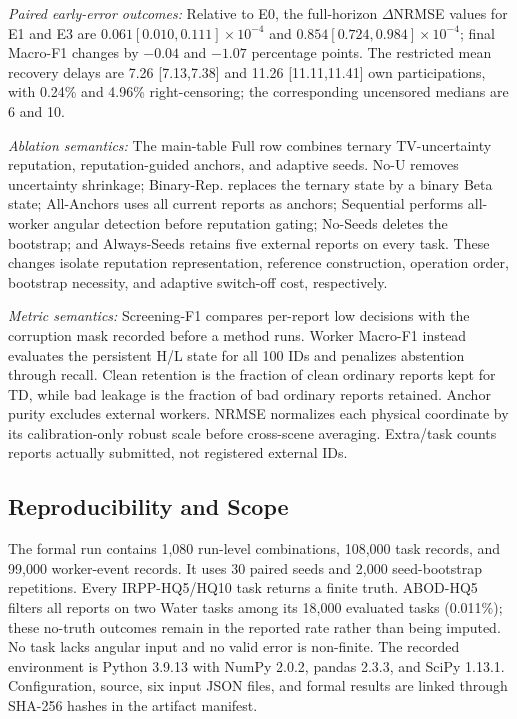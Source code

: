 \documentclass[journal]{IEEEtran}
\begin{document}
\textit{Paired early-error outcomes:}
Relative to E0, the full-horizon $\Delta$NRMSE values for E1 and E3 are
$0.061[0.010,0.111]\times10^{-4}$ and
$0.854[0.724,0.984]\times10^{-4}$; final Macro-F1 changes by $-0.04$ and
$-1.07$ percentage points. The restricted mean recovery delays are
7.26 [7.13,7.38] and 11.26 [11.11,11.41] own participations, with 0.24\% and
4.96\% right-censoring; the corresponding uncensored medians are 6 and 10.

\textit{Ablation semantics:}
The main-table Full row combines ternary TV-uncertainty reputation,
reputation-guided anchors, and adaptive seeds. No-U removes uncertainty
shrinkage; Binary-Rep. replaces the ternary state by a binary Beta state;
All-Anchors uses all current reports as anchors; Sequential performs all-worker
angular detection before reputation gating; No-Seeds deletes the bootstrap;
and Always-Seeds retains five external reports on every task. These changes
isolate reputation representation, reference construction, operation order,
bootstrap necessity, and adaptive switch-off cost, respectively.

\textit{Metric semantics:}
Screening-F1 compares per-report low decisions with the corruption mask recorded
before a method runs. Worker Macro-F1 instead evaluates the persistent H/L
state for all 100 IDs and penalizes abstention through recall. Clean retention
is the fraction of clean ordinary reports kept for TD, while bad leakage is the
fraction of bad ordinary reports retained. Anchor purity excludes external
workers. NRMSE normalizes each physical coordinate by its calibration-only
robust scale before cross-scene averaging. Extra/task counts reports actually
submitted, not registered external IDs.

\subsection{Reproducibility and Scope}
\label{sec:supp-reproducibility}

The formal run contains 1,080 run-level combinations, 108,000 task records,
and 99,000 worker-event records. It uses 30 paired seeds and 2,000
seed-bootstrap repetitions. Every IRPP-HQ5/HQ10 task returns a finite truth.
ABOD-HQ5 filters all reports on two Water tasks among its 18,000 evaluated
tasks (0.011\%); these no-truth outcomes remain in the reported rate rather than
being imputed. No task lacks angular input and no valid error is non-finite. The
recorded environment is Python 3.9.13 with NumPy 2.0.2, pandas 2.3.3, and SciPy
1.13.1. Configuration, source, six input JSON files, and formal results are
linked through SHA-256 hashes in the artifact manifest.
\end{document}
